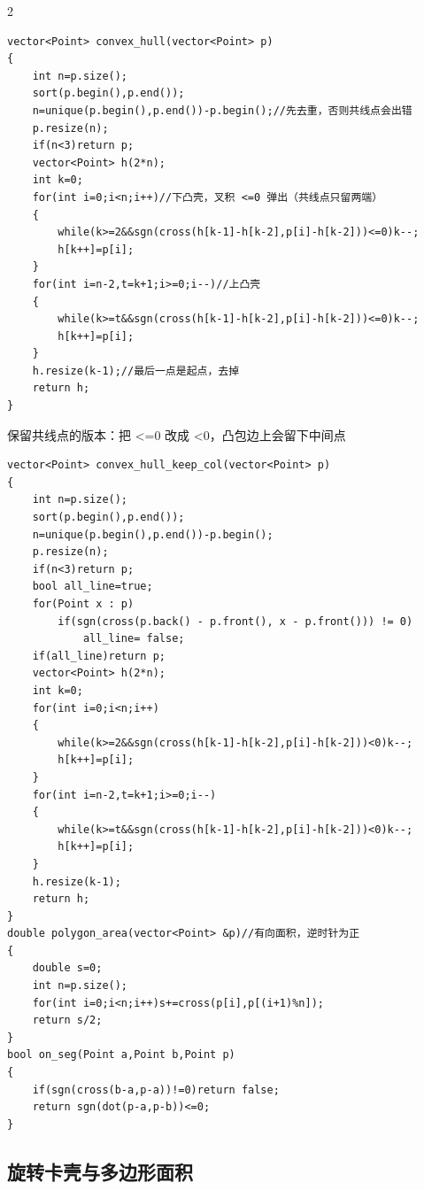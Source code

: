 \documentclass[UTF8,fontset=fandol,a4paper,twoside]{ctexart}
\newcommand{\note}[1]{{\fontsize{10}{12}\selectfont #1\par}}
\begin{document}
\begin{multicols}{2}
\begin{lstlisting}
vector<Point> convex_hull(vector<Point> p)
{
    int n=p.size();
    sort(p.begin(),p.end());
    n=unique(p.begin(),p.end())-p.begin();//先去重，否则共线点会出错
    p.resize(n);
    if(n<3)return p;
    vector<Point> h(2*n);
    int k=0;
    for(int i=0;i<n;i++)//下凸壳，叉积 <=0 弹出（共线点只留两端）
    {
        while(k>=2&&sgn(cross(h[k-1]-h[k-2],p[i]-h[k-2]))<=0)k--;
        h[k++]=p[i];
    }
    for(int i=n-2,t=k+1;i>=0;i--)//上凸壳
    {
        while(k>=t&&sgn(cross(h[k-1]-h[k-2],p[i]-h[k-2]))<=0)k--;
        h[k++]=p[i];
    }
    h.resize(k-1);//最后一点是起点，去掉
    return h;
}
\end{lstlisting}
\note{保留共线点的版本：把 <\allowbreak{}=\allowbreak{}0 改成 <\allowbreak{}0，凸包边上会留下中间点}
\begin{lstlisting}
vector<Point> convex_hull_keep_col(vector<Point> p)
{
    int n=p.size();
    sort(p.begin(),p.end());
    n=unique(p.begin(),p.end())-p.begin();
    p.resize(n);
    if(n<3)return p;
    bool all_line=true;
    for(Point x : p)
        if(sgn(cross(p.back() - p.front(), x - p.front())) != 0)
            all_line= false;
    if(all_line)return p;
    vector<Point> h(2*n);
    int k=0;
    for(int i=0;i<n;i++)
    {
        while(k>=2&&sgn(cross(h[k-1]-h[k-2],p[i]-h[k-2]))<0)k--;
        h[k++]=p[i];
    }
    for(int i=n-2,t=k+1;i>=0;i--)
    {
        while(k>=t&&sgn(cross(h[k-1]-h[k-2],p[i]-h[k-2]))<0)k--;
        h[k++]=p[i];
    }
    h.resize(k-1);
    return h;
}
double polygon_area(vector<Point> &p)//有向面积，逆时针为正
{
    double s=0;
    int n=p.size();
    for(int i=0;i<n;i++)s+=cross(p[i],p[(i+1)%n]);
    return s/2;
}
bool on_seg(Point a,Point b,Point p)
{
    if(sgn(cross(b-a,p-a))!=0)return false;
    return sgn(dot(p-a,p-b))<=0;
}
\end{lstlisting}
\subsection{旋转卡壳与多边形面积}


\end{multicols}
\end{document}
